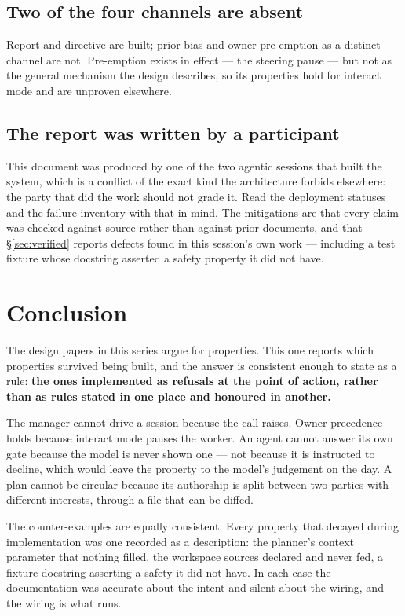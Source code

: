 \documentclass[11pt]{article}
\begin{document}
\subsection{Two of the four channels are absent}

Report and directive are built; prior bias and owner pre-emption as a distinct channel are not. Pre-emption exists in effect --- the steering pause --- but not as the general mechanism the design describes, so its properties hold for interact mode and are unproven elsewhere.

\subsection{The report was written by a participant}

This document was produced by one of the two agentic sessions that built the system, which is a conflict of the exact kind the architecture forbids elsewhere: the party that did the work should not grade it. Read the deployment statuses and the failure inventory with that in mind. The mitigations are that every claim was checked against source rather than against prior documents, and that \S\ref{sec:verified} reports defects found in this session's own work --- including a test fixture whose docstring asserted a safety property it did not have.

\section{Conclusion}

The design papers in this series argue for properties. This one reports which properties survived being built, and the answer is consistent enough to state as a rule: \textbf{the ones implemented as refusals at the point of action, rather than as rules stated in one place and honoured in another.}

The manager cannot drive a session because the call raises. Owner precedence holds because interact mode pauses the worker. An agent cannot answer its own gate because the model is never shown one --- not because it is instructed to decline, which would leave the property to the model's judgement on the day. A plan cannot be circular because its authorship is split between two parties with different interests, through a file that can be diffed.

The counter-examples are equally consistent. Every property that decayed during implementation was one recorded as a description: the planner's context parameter that nothing filled, the workspace sources declared and never fed, a fixture docstring asserting a safety it did not have. In each case the documentation was accurate about the intent and silent about the wiring, and the wiring is what runs.
\end{document}
